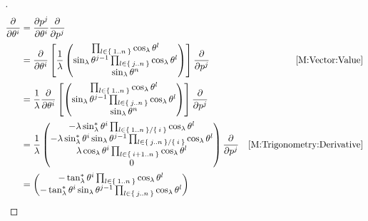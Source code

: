 \documentclass[../main.tex]{subfiles}
\begin{document}
\begin{proof}[]
\begin{align*}
\frac{\partial}{\partial\tensor{\theta}{^i}}
&=\frac{\partial\tensor{p}{^j}}{\partial\tensor{\theta}{^i}}\frac{\partial}{\partial\tensor{p}{^j}}\\
&=\frac{\partial}{\partial\tensor{\theta}{^i}}
\left[
\frac{1}{\lambda}
\begin{pmatrix}
\prod_{l\in\Set{1..n}}{\cos_\lambda{\tensor{\theta}{^l}}}\\
\sin_\lambda{\tensor{\theta}{^{j-1}}}\prod_{l\in\Set{j..n}}{\cos_\lambda{\tensor{\theta}{^l}}}\\
\sin_\lambda{{\tensor{\theta}{^n}}}\\
\end{pmatrix}
\right]\frac{\partial}{\partial\tensor{p}{^j}}&\text{\cref{M:Vector:Value}}\\
&=
\frac{1}{\lambda}
\frac{\partial}{\partial\tensor{\theta}{^i}}
\left[
\begin{pmatrix}
\prod_{l\in\Set{1..n}}{\cos_\lambda{\tensor{\theta}{^l}}}\\
\sin_\lambda{\tensor{\theta}{^{j-1}}}\prod_{l\in\Set{j..n}}{\cos_\lambda{\tensor{\theta}{^l}}}\\
\sin_\lambda{{\tensor{\theta}{^n}}}\\
\end{pmatrix}
\right]\frac{\partial}{\partial\tensor{p}{^j}}\\
&=
\frac{1}{\lambda}
\begin{pmatrix}
-\lambda\sin_\lambda^\ast{\tensor{\theta}{^i}}\prod_{l\in\Set{1..n}/\Set{i}}{\cos_\lambda{\tensor{\theta}{^l}}}\\
-\lambda\sin_\lambda^\ast{\tensor{\theta}{^i}}\sin_\lambda{\tensor{\theta}{^{j-1}}}\prod_{l\in\Set{j..n}/\Set{i}}{\cos_\lambda{\tensor{\theta}{^l}}}\\
\lambda\cos_\lambda{\tensor{\theta}{^{i}}}\prod_{l\in\Set{i+1..n}}{\cos_\lambda{\tensor{\theta}{^l}}}\\
0\\
\end{pmatrix}\frac{\partial}{\partial\tensor{p}{^j}}&\text{\cref{M:Trigonometry:Derivative}}\\
&=
\begin{pmatrix}
-\tan_\lambda^\ast{\tensor{\theta}{^i}}\prod_{l\in\Set{1..n}}{\cos_\lambda{\tensor{\theta}{^l}}}\\
-\tan_\lambda^\ast{\tensor{\theta}{^i}}\sin_\lambda{\tensor{\theta}{^{j-1}}}\prod_{l\in\Set{j..n}}{\cos_\lambda{\tensor{\theta}{^l}}}\\

\end{pmatrix}
\end{align*}
\end{proof}
\end{document}
